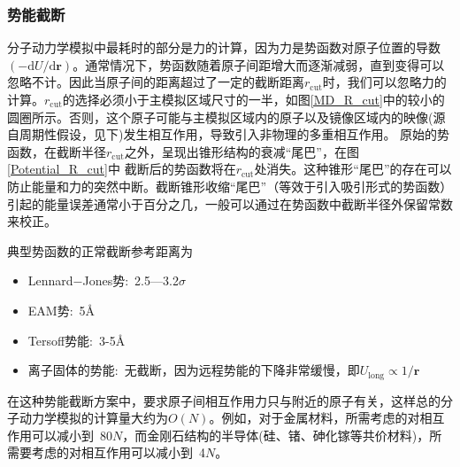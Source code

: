 \subsubsection{势能截断}
分子动力学模拟中最耗时的部分是力的计算，因为力是势函数对原子位置的导数$(-\mathrm{d}U/\mathrm{d}\mathbf{r})$。通常情况下，势函数随着原子间距增大而逐渐减弱，直到变得可以忽略不计。因此当原子间的距离超过了一定的截断距离$r_{\mathrm{cut}}$时，我们可以忽略力的计算。$r_{\mathrm{cut}}$的选择必须小于主模拟区域尺寸的一半，如图\ref{MD_R_cut}中的较小的圆圈所示。否则，这个原子可能与主模拟区域内的原子以及镜像区域内的映像(源自周期性假设，见下)发生相互作用，导致引入非物理的多重相互作用。
原始的势函数，在截断半径$r_{\mathrm{cut}}$之外，呈现出锥形结构的衰减“尾巴”，在图\ref{Potential_R_cut}中 截断后的势函数将在$r_{\mathrm{cut}}$处消失。这种锥形“尾巴”的存在可以防止能量和力的突然中断。截断锥形收缩“尾巴”（等效于引入吸引形式的势函数）引起的能量误差通常小于百分之几，一般可以通过在势函数中截断半径外保留常数来校正。

典型势函数的正常截断参考距离为
\begin{itemize}
	\item \textrm{Lennard−Jones}势:~2.5—3.2$\sigma$
	\item \textrm{EAM}势:~5\AA
	\item \textrm{Tersoff}势能:~3-5\AA
	\item 离子固体的势能:~无截断，因为远程势能的下降非常缓慢，即$U_{\mathrm{long}}\propto1/\mathbf{r}$
\end{itemize}
在这种势能截断方案中，要求原子间相互作用力只与附近的原子有关，这样总的分子动力学模拟的计算量大约为$O(N)$。例如，对于金属材料，所需考虑的对相互作用可以减小到~80$N$，而金刚石结构的半导体(硅、锗、砷化镓等共价材料)，所需要考虑的对相互作用可以减小到~4$N$。

